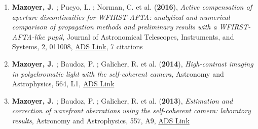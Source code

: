 \documentclass[11pt]{article}
\begin{document}
\begin{enumerate}
\item {\bf Mazoyer, J.} ; Pueyo, L. ; Norman, C. et al. ({\bf2016}), {\it Active compensation of aperture discontinuities for WFIRST-AFTA: analytical and numerical comparison of propagation methods and preliminary results with a WFIRST-AFTA-like pupil}, Journal of Astronomical Telescopes, Instruments, and Systems, 2, 011008, \href{https://ui.adsabs.harvard.edu/abs/2016JATIS...2a1008M/abstract}{ADS Link}, 7 citations




\item {\bf Mazoyer, J.} ; Baudoz, P. ; Galicher, R. et al. ({\bf2014}), {\it High-contrast imaging in polychromatic light with the self-coherent camera}, Astronomy and Astrophysics, 564, L1, \href{https://ui.adsabs.harvard.edu/abs/2014A&A...564L...1M/abstract}{ADS Link}

\item {\bf Mazoyer, J.} ; Baudoz, P. ; Galicher, R. et al. ({\bf2013}), {\it Estimation and correction of wavefront aberrations using the self-coherent camera: laboratory results}, Astronomy and Astrophysics, 557, A9, \href{https://ui.adsabs.harvard.edu/abs/2013A&A...557A...9M/abstract}{ADS Link}

\end{enumerate}


\end{document}
